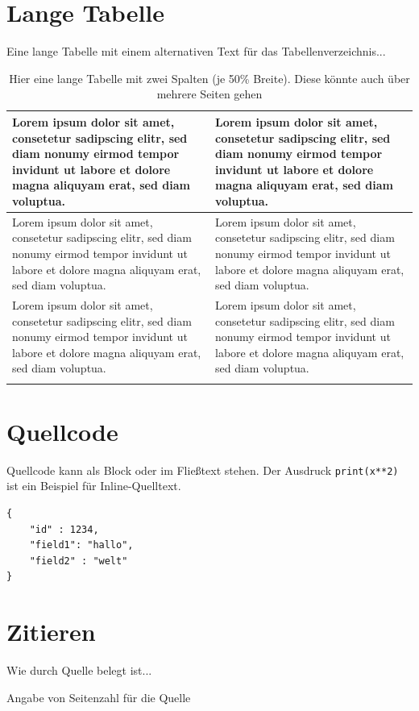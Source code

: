\section{Lange Tabelle}
Eine lange Tabelle mit einem alternativen Text für das Tabellenverzeichnis...
\begin{longtable}{p{0.5\linewidth} p{0.5\linewidth}}
    \hline
    Lorem ipsum dolor sit amet, consetetur sadipscing elitr, sed diam nonumy eirmod tempor invidunt ut labore et dolore magna aliquyam erat, sed diam voluptua. &
    Lorem ipsum dolor sit amet, consetetur sadipscing elitr, sed diam nonumy eirmod tempor invidunt ut labore et dolore magna aliquyam erat, sed diam voluptua. \\
    \hline
    Lorem ipsum dolor sit amet, consetetur sadipscing elitr, sed diam nonumy eirmod tempor invidunt ut labore et dolore magna aliquyam erat, sed diam voluptua. &
    Lorem ipsum dolor sit amet, consetetur sadipscing elitr, sed diam nonumy eirmod tempor invidunt ut labore et dolore magna aliquyam erat, sed diam voluptua. \\
    \hline
    Lorem ipsum dolor sit amet, consetetur sadipscing elitr, sed diam nonumy eirmod tempor invidunt ut labore et dolore magna aliquyam erat, sed diam voluptua. &
    Lorem ipsum dolor sit amet, consetetur sadipscing elitr, sed diam nonumy eirmod tempor invidunt ut labore et dolore magna aliquyam erat, sed diam voluptua. \\
    \hline
\caption[Alternativer kürzerer Text für eine Caption]{Hier eine lange Tabelle mit zwei Spalten (je 50\% Breite). Diese könnte auch über mehrere Seiten gehen}
\label{tbl_longtable}
\end{longtable}

\section{Quellcode}
Quellcode kann als Block oder im Fließtext stehen. Der Ausdruck \texttt{print(x**2)} ist ein Beispiel für Inline-Quelltext.

\begin{verbatim}
{   
    "id" : 1234,  
    "field1": "hallo",  
    "field2" : "welt"
}
\end{verbatim}

\section{Zitieren}
Wie durch Quelle \cite{Nobody06} belegt ist...

Angabe von Seitenzahl für die Quelle \cite[S. 5ff]{Nobody07}
